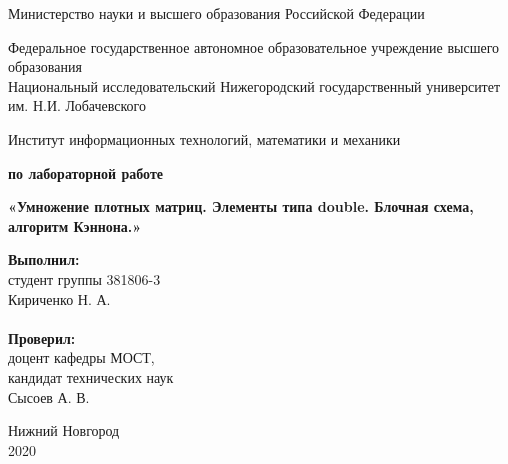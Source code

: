 \documentclass{report}
\begin{document}
\begin{titlepage}

\begin{center}
Министерство науки и высшего образования Российской Федерации
\end{center}

\begin{center}
Федеральное государственное автономное образовательное учреждение высшего образования \\
Национальный исследовательский Нижегородский государственный университет им. Н.И. Лобачевского
\end{center}

\begin{center}
Институт информационных технологий, математики и механики
\end{center}

\vspace{4em}

\begin{center}
\textbf{ по лабораторной работе} \\
\end{center}
\begin{center}
\textbf{\Large «Умножение плотных матриц. Элементы типа double. Блочная схема, алгоритм Кэннона.»}
\vspace{4em}
\end{center}
\newbox{\lbox}
\newlength{\maxl}
\setlength{\maxl}{\wd\lbox}
\hfill\parbox{7cm}{
\hspace*{5cm}\hspace*{-5cm}\textbf{Выполнил:} \\ студент группы 381806-3 \\ Кириченко Н. А.\\
\\
\hspace*{5cm}\hspace*{-5cm}\textbf{Проверил:}\\ доцент кафедры МОСТ, \\ кандидат технических наук \\ Сысоев А. В.\\
}
\vspace{\fill}

\begin{center} Нижний Новгород \\ 2020 \end{center}

\end{titlepage}
\end{document}
